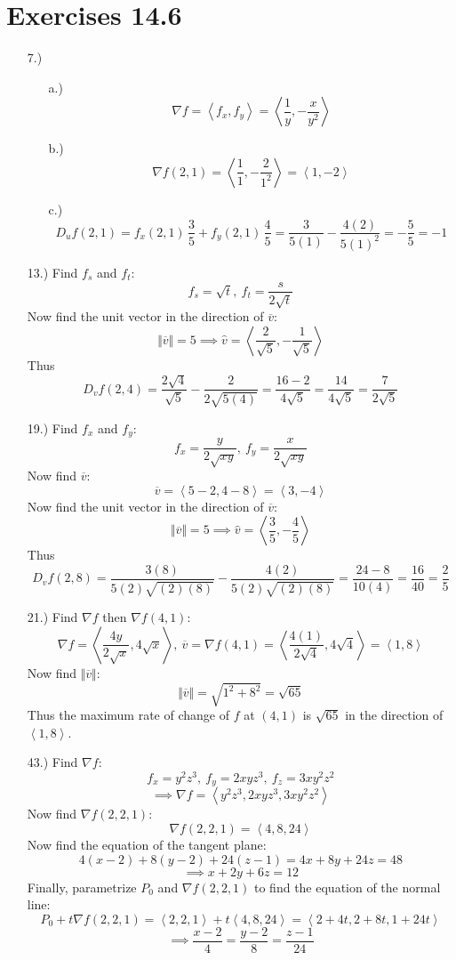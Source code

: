 \documentclass[12pt]{article}
\newcommand{\angleb}[1]{\left\langle#1\right\rangle}
\begin{document}
\section*{Exercises 14.6}
\begin{itemize}
    \item [7.)] \begin{itemize}
        \item [a.)] \[\nabla f=\angleb{f_x,f_y}=\angleb{\frac{1}{y},-\frac{x}{y^2}}\]

        \item [b.)] \[\nabla f(2,1)=\angleb{\frac{1}{1},-\frac{2}{1^2}}=\angleb{1,-2}\]

        \item [c.)] \[D_uf(2,1)=f_x(2,1)\,\frac{3}{5}+f_y(2,1)\,\frac{4}{5}=\frac{3}{5(1)}-\frac{4(2)}{5(1)^2}=-\frac{5}{5}=-1\]
    \end{itemize}

    \item [13.)] Find $f_s$ and $f_t$:
    \[f_s=\sqrt{t},\ f_t=\frac{s}{2\sqrt{t}}\]
    Now find the unit vector in the direction of $\overline{v}$:
    \[\Vert\overline{v}\Vert=5\implies\hat{v}=\angleb{\frac{2}{\sqrt{5}},-\frac{1}{\sqrt{5}}}\]
    Thus
    \[D_vf(2,4)=\frac{2\sqrt{4}}{\sqrt{5}}-\frac{2}{2\sqrt{5(4)}}=\frac{16-2}{4\sqrt{5}}=\frac{14}{4\sqrt{5}}=\frac{7}{2\sqrt{5}}\]

    \pagebreak
    \item [19.)] Find $f_x$ and $f_y$:
    \[f_x=\frac{y}{2\sqrt{xy}},\ f_y=\frac{x}{2\sqrt{xy}}\]
    Now find $\overline{v}$:
    \[\overline{v}=\angleb{5-2,4-8}=\angleb{3,-4}\]
    Now find the unit vector in the direction of $\overline{v}$:
    \[\Vert\overline{v}\Vert=5\implies\hat{v}=\angleb{\frac{3}{5},-\frac{4}{5}}\]
    Thus
    \[D_vf(2,8)=\frac{3(8)}{5(2)\sqrt{(2)(8)}}-\frac{4(2)}{5(2)\sqrt{(2)(8)}}=\frac{24-8}{10(4)}=\frac{16}{40}=\frac{2}{5}\]

    \item [21.)] Find $\nabla f$ then $\nabla f(4,1)$:
    \[\nabla f=\angleb{\frac{4y}{2\sqrt{x}},4\sqrt{x}},\ \overline{v}=\nabla f(4,1)=\angleb{\frac{4(1)}{2\sqrt{4}},4\sqrt{4}}=\angleb{1,8}\]
    Now find $\Vert\overline{v}\Vert$:
    \[\Vert\overline{v}\Vert=\sqrt{1^2+8^2}=\sqrt{65}\]
    Thus the maximum rate of change of $f$ at $(4,1)$ is $\sqrt{65}$ in the direction of $\angleb{1,8}$.

    \item [43.)] Find $\nabla f$:
    \[f_x=y^2z^3,\ f_y=2xyz^3,\ f_z=3xy^2z^2\]
    \[\implies\nabla f=\angleb{y^2z^3,2xyz^3,3xy^2z^2}\]
    Now find $\nabla f(2,2,1)$:
    \[\nabla f(2,2,1)=\angleb{4,8,24}\]
    Now find the equation of the tangent plane:
    \[4(x-2)+8(y-2)+24(z-1)=4x+8y+24z=48\]
    \[\implies x+2y+6z=12\]
    Finally, parametrize $P_0$ and $\nabla f(2,2,1)$ to find the equation of the normal line:
    \[P_0+t\nabla f(2,2,1)=\angleb{2,2,1}+t\angleb{4,8,24}=\angleb{2+4t,2+8t,1+24t}\]
    \[\implies \frac{x-2}{4}=\frac{y-2}{8}=\frac{z-1}{24}\]


\end{itemize}
\end{document}
